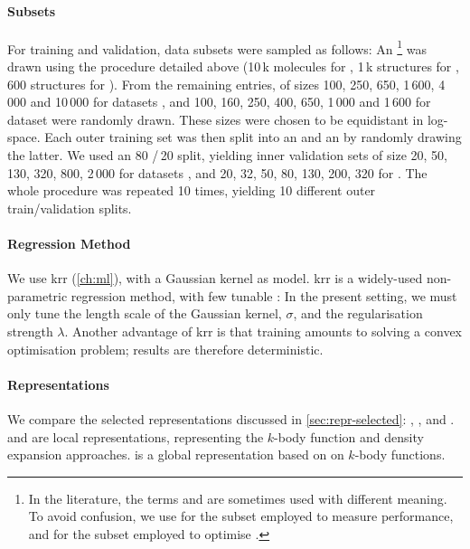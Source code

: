 \paragraph{Subsets}
For training and validation, data subsets were sampled as follows:
An %
\footnote{In the literature, the terms  and  are sometimes used with different meaning.
To avoid confusion, we use  for the subset employed to measure performance, and  for the subset employed to optimise \hps.}
was drawn using the procedure detailed above (10\,k molecules for \dsgdb{}, 1\,k structures for \dsba{}, 600 structures for \dstco{}).
From the remaining entries,  of sizes 100, 250, 650, 1\,600, 4\,000 and 10\,000 for datasets \dsgdb{}, \dsba{} and 100, 160, 250, 400, 650, 1\,000 and 1\,600 for dataset \dstco{} were randomly drawn.
These sizes were chosen to be equidistant in log-space.
Each outer training set was then split into an  and an  by randomly drawing the latter.
We used an 80\,\,/\,20 split, yielding inner validation sets of size 20, 50, 130, 320, 800, 2\,000 for datasets \dsgdb{}, \dsba{} and 20, 32, 50, 80, 130, 200, 320 for \dstco{}.
The whole procedure was repeated 10 times, yielding 10 different outer train/validation splits.

\paragraph{Regression Method}
We use \gls{krr} (\cref{ch:ml}), with a Gaussian kernel as \ml model. \Gls{krr} is a widely-used non-parametric regression method, with few tunable \hps: In the present setting, we must only tune the length scale of the Gaussian kernel, $\sigma$, and the regularisation strength $\lambda$. Another advantage of \gls{krr} is that training amounts to solving a convex optimisation problem; results are therefore deterministic.

\paragraph{Representations}
We compare the selected representations discussed in \cref{sec:repr-selected}: \sfs, \soap, and \mbtr. \sfs and \soap are local representations, representing the $k$-body function and density expansion approaches. \mbtr is a global representation based on on $k$-body functions.

